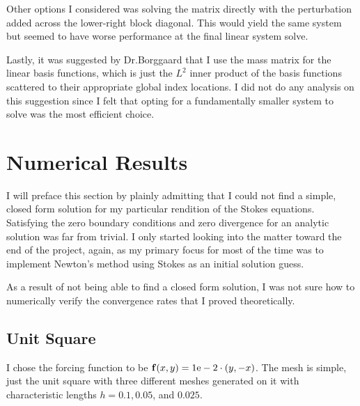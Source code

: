 \documentclass[12pt]{article}
\begin{document}
            Other options I considered was solving the matrix directly with the
            perturbation added across the lower-right block diagonal. This
            would yield the same system but seemed to have worse performance at
            the final linear system solve.

            Lastly, it was suggested by Dr.Borggaard that I use the mass
            matrix for the linear basis functions, which is just the $L^2$
            inner product of the basis functions scattered to their appropriate
            global index locations. I did not do any analysis on this
            suggestion since I felt that opting for a fundamentally smaller
            system to solve was the most efficient choice.

                \section{Numerical Results}

                I will preface this section by plainly admitting that I could
                not find a simple, closed form solution for my particular
                rendition of the Stokes equations. Satisfying the zero boundary
                conditions and zero divergence for an analytic solution was far
                from trivial. I only started looking into the matter toward the
                end of the project, again, as my primary focus for most of the
                time was to implement Newton's method using Stokes as an
                initial solution guess.

                As a result of not being able to find a closed form solution, I
                was not sure how to numerically verify the convergence rates
                that I proved theoretically.


                \subsection{Unit Square}

                I chose the forcing function to be $\mathbf{f}(x,y) = 1\text{e}-2 \cdot (y, -x)$. The mesh is simple, just the unit square with three
                different meshes generated on it with characteristic lengths $h = 0.1, 0.05$, and $0.025$.
\end{document}
